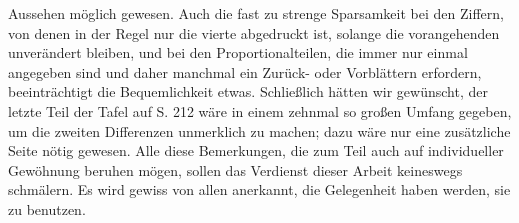 Aussehen möglich gewesen. Auch die fast zu strenge Sparsamkeit bei den Ziffern, von denen in der Regel nur die vierte abgedruckt ist, solange die vorangehenden unverändert bleiben, und bei den Proportionalteilen, die immer nur einmal angegeben sind und daher manchmal ein Zurück- oder Vorblättern erfordern, beeinträchtigt die Bequemlichkeit etwas. Schließlich hätten wir gewünscht, der letzte Teil der Tafel auf S. 212 wäre in einem zehnmal so großen Umfang gegeben, um die zweiten Differenzen unmerklich zu machen; dazu wäre  nur eine zusätzliche Seite nötig gewesen. Alle diese Bemerkungen, die zum Teil auch auf individueller Gewöhnung beruhen mögen, sollen das Verdienst dieser Arbeit keineswegs schmälern. Es wird gewiss von allen anerkannt, die Gelegenheit haben werden, sie zu benutzen.

